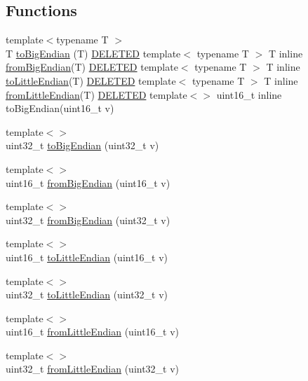 \subsection*{Functions}
\begin{DoxyCompactItemize}
\item 
{\footnotesize template$<$typename T $>$ }\\T \mbox{\hyperlink{namespacedisplace_1_1formats_1_1helpers_aa87d7f7cd11f2a4890d28828fe5e0def}{to\+Big\+Endian}} (T) \mbox{\hyperlink{endian_8h_ab792dfd97ab00abb6a5fc20191a9e952}{D\+E\+L\+E\+T\+ED}} template$<$ typename T $>$ T inline \mbox{\hyperlink{namespacedisplace_1_1formats_1_1helpers_ab69e9e18789361a5ad95240acb8cf0f0}{from\+Big\+Endian}}(T) \mbox{\hyperlink{endian_8h_ab792dfd97ab00abb6a5fc20191a9e952}{D\+E\+L\+E\+T\+ED}} template$<$ typename T $>$ T inline \mbox{\hyperlink{namespacedisplace_1_1formats_1_1helpers_a99c347ed9cab3bb4645f15fb3c4e27e5}{to\+Little\+Endian}}(T) \mbox{\hyperlink{endian_8h_ab792dfd97ab00abb6a5fc20191a9e952}{D\+E\+L\+E\+T\+ED}} template$<$ typename T $>$ T inline \mbox{\hyperlink{namespacedisplace_1_1formats_1_1helpers_a5f7a4983bcdd526e671565f45a76a34a}{from\+Little\+Endian}}(T) \mbox{\hyperlink{endian_8h_ab792dfd97ab00abb6a5fc20191a9e952}{D\+E\+L\+E\+T\+ED}} template$<$$>$ uint16\+\_\+t inline to\+Big\+Endian(uint16\+\_\+t v)
\item 
{\footnotesize template$<$$>$ }\\uint32\+\_\+t \mbox{\hyperlink{namespacedisplace_1_1formats_1_1helpers_ac1563477486c0b8431bd3a440e67e8c0}{to\+Big\+Endian}} (uint32\+\_\+t v)
\item 
{\footnotesize template$<$$>$ }\\uint16\+\_\+t \mbox{\hyperlink{namespacedisplace_1_1formats_1_1helpers_ab69e9e18789361a5ad95240acb8cf0f0}{from\+Big\+Endian}} (uint16\+\_\+t v)
\item 
{\footnotesize template$<$$>$ }\\uint32\+\_\+t \mbox{\hyperlink{namespacedisplace_1_1formats_1_1helpers_ab0b05dc87fc8e27fee8f23b6e1cd8ea6}{from\+Big\+Endian}} (uint32\+\_\+t v)
\item 
{\footnotesize template$<$$>$ }\\uint16\+\_\+t \mbox{\hyperlink{namespacedisplace_1_1formats_1_1helpers_a99c347ed9cab3bb4645f15fb3c4e27e5}{to\+Little\+Endian}} (uint16\+\_\+t v)
\item 
{\footnotesize template$<$$>$ }\\uint32\+\_\+t \mbox{\hyperlink{namespacedisplace_1_1formats_1_1helpers_a85317eec21d4f89518a3972a556826fa}{to\+Little\+Endian}} (uint32\+\_\+t v)
\item 
{\footnotesize template$<$$>$ }\\uint16\+\_\+t \mbox{\hyperlink{namespacedisplace_1_1formats_1_1helpers_a5f7a4983bcdd526e671565f45a76a34a}{from\+Little\+Endian}} (uint16\+\_\+t v)
\item 
{\footnotesize template$<$$>$ }\\uint32\+\_\+t \mbox{\hyperlink{namespacedisplace_1_1formats_1_1helpers_a71d661eccec2286c4bacb3770486a269}{from\+Little\+Endian}} (uint32\+\_\+t v)
\end{DoxyCompactItemize}


